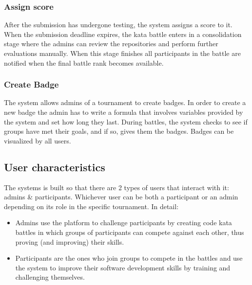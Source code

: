 \documentclass{article}
\newcommand{\admins}{admins }
\newcommand{\user}{user }
\begin{document}
            \subsubsection{Assign score}
                After the submission has undergone testing, the system assigns a score to it. When the submission deadline expires, the kata battle enters in a consolidation stage where the \admins can review the repositories and perform further evaluations manually. When this stage finishes all participants in the battle are notified when the final battle rank becomes available.
                         
            \subsubsection{Create Badge}
                The system allows \admins of a tournament to create badges. In order to create a new badge the admin has to write a formula that involves variables provided by the system and set how long they last. During battles, the system checks to see if groups have met their goals, and if so, gives them the badges. Badges can be visualized by all users.

    \subsection{User characteristics}\label{sec:user_characteristics}
    The systems is built so that there are 2 types of users that interact with it: admins \& participants.
    Whichever \user can be both a participant or an admin depending on its role in the specific tournament. In detail:
        \begin{itemize}
        \item Admins use the platform to challenge participants by creating code
            kata battles in which groups of participants can compete against each other, thus proving (and improving) their skills.
        \item Participants are the ones who join groups to compete in the battles and use the system to improve their software development skills by training and challenging themselves.
        \end{itemize}
   
\end{document}
